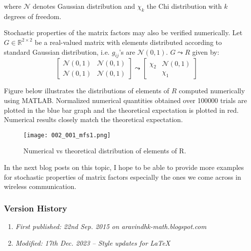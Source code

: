 where $\mathcal{N}$ denotes Gaussian distribution and $\chi_k$ the Chi distribution with $k$ degrees of freedom.

Stochastic properties of the matrix factors may also be verified numerically. Let $G \in \mathbb{R}^{2 \times 2}$ be a real-valued matrix with elements distributed according to standard Gaussian distribution, i.e. $g_{ij}$'s are $\mathcal{N}(0,1)$. $G \leadsto R$ given by:
$$
\begin{bmatrix}
	\mathcal{N}(0,1) & \mathcal{N}(0,1) \\
	\mathcal{N}(0,1) & \mathcal{N}(0,1)
\end{bmatrix} \leadsto
\begin{bmatrix}
	\chi_2 & \mathcal{N}(0,1) \\
	& \chi_1
\end{bmatrix}
$$

Figure below illustrates the distributions of elements of $R$ computed numerically using MATLAB. Normalized numerical quantities obtained over 100000 trials are plotted in the blue bar graph and the theoretical expectation is plotted in red. Numerical results closely match the theoretical expectation.

\begin{figure}[H]
	\centering
	\texttt{[image: 002\_001\_mfs1.png]}
	\caption{Numerical vs theoretical distribution of elements of R.}
\end{figure}

In the next blog posts on this topic, I hope to be able to provide more examples for stochastic properties of matrix factors especially the ones we come across in wireless communication.

\subsubsection{Version History}
\begin{enumerate}
	\item \emph{First published: 22nd Sep. 2015 on aravindhk-math.blogspot.com}
	\item \emph{Modified: 17th Dec. 2023 -- Style updates for \LaTeX}
\end{enumerate}
